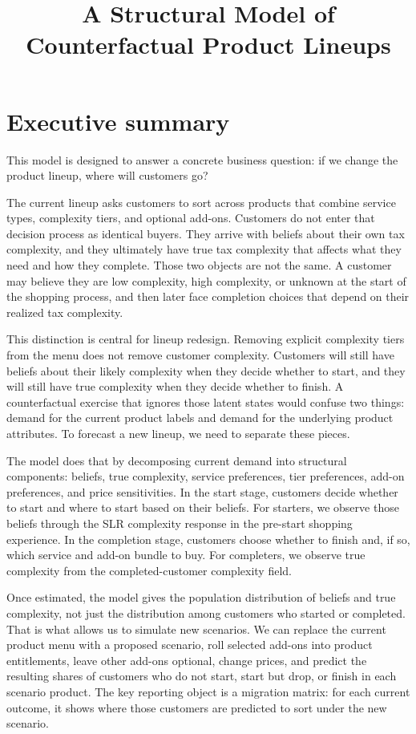\documentclass[11pt]{article}
\title{A Structural Model of Counterfactual Product Lineups}
\author{}
\date{}
\begin{document}
\maketitle


\section*{Executive summary}

This model is designed to answer a concrete business question: if we change the product lineup, where will customers go?

The current lineup asks customers to sort across products that combine service types, complexity tiers, and optional add-ons. Customers do not enter that decision process as identical buyers. They arrive with beliefs about their own tax complexity, and they ultimately have true tax complexity that affects what they need and how they complete. Those two objects are not the same. A customer may believe they are low complexity, high complexity, or unknown at the start of the shopping process, and then later face completion choices that depend on their realized tax complexity.

This distinction is central for lineup redesign. Removing explicit complexity tiers from the menu does not remove customer complexity. Customers will still have beliefs about their likely complexity when they decide whether to start, and they will still have true complexity when they decide whether to finish. A counterfactual exercise that ignores those latent states would confuse two things: demand for the current product labels and demand for the underlying product attributes. To forecast a new lineup, we need to separate these pieces.

The model does that by decomposing current demand into structural components: beliefs, true complexity, service preferences, tier preferences, add-on preferences, and price sensitivities. In the start stage, customers decide whether to start and where to start based on their beliefs. For starters, we observe those beliefs through the SLR complexity response in the pre-start shopping experience. In the completion stage, customers choose whether to finish and, if so, which service and add-on bundle to buy. For completers, we observe true complexity from the completed-customer complexity field.

Once estimated, the model gives the population distribution of beliefs and true complexity, not just the distribution among customers who started or completed. That is what allows us to simulate new scenarios. We can replace the current product menu with a proposed scenario, roll selected add-ons into product entitlements, leave other add-ons optional, change prices, and predict the resulting shares of customers who do not start, start but drop, or finish in each scenario product. The key reporting object is a migration matrix: for each current outcome, it shows where those customers are predicted to sort under the new scenario.
\end{document}
